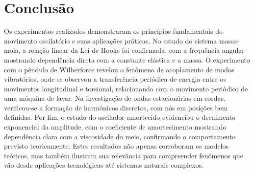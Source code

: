\section{Conclusão} 

Os experimentos realizados demonstraram os princípios fundamentais do movimento oscilatório e suas aplicações práticas. No estudo do sistema massa-mola, a relação linear da Lei de Hooke foi confirmada, com a frequência angular mostrando dependência direta com a constante elástica e a massa. O experimento com o pêndulo de Wilberforce revelou o fenômeno de acoplamento de modos vibratórios, onde se observou a transferência periódica de energia entre os movimentos longitudinal e torsional, relacionando com o movimento periódico de uma máquina de lavar. Na investigação de ondas estacionárias em cordas, verificou-se a formação de harmônicos discretos, com nós em posições bem definidas. Por fim, o estudo do oscilador amortecido evidenciou o decaimento exponencial da amplitude, com o coeficiente de amortecimento mostrando dependência clara com a viscosidade do meio, confirmando o comportamento previsto teoricamente. Estes resultados não apenas corroboram os modelos teóricos, mas também ilustram sua relevância para compreender fenômenos que vão desde aplicações tecnológicas até sistemas naturais complexos.
